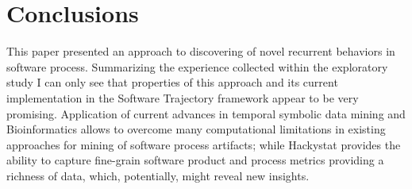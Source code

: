 \documentclass{sig-alternate}
\begin{document}
\section{Conclusions}
This paper presented an approach to discovering of novel recurrent behaviors in software process. Summarizing the experience collected within the exploratory study I can only see that properties of this approach and its current implementation in the Software Trajectory framework appear to be very promising. Application of current advances in temporal symbolic data mining and Bioinformatics allows to overcome many computational limitations in existing approaches for mining of software process artifacts; while Hackystat provides the ability to capture fine-grain software product and process metrics providing a richness of data, which, potentially, might reveal new insights.


\end{document}
